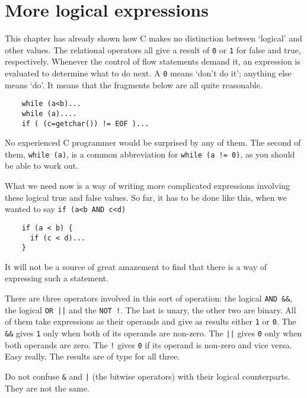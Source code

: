  
        \section{More logical expressions}
        

  

  This chapter has already shown how C makes no distinction between
   `logical' and other values. The relational operators all give a
   result of \texttt{0} or \texttt{1} for false and true,
   respectively. Whenever the control of flow statements demand it, an
   expression is evaluated to determine what to do next. A \texttt{0}
   means `don't do it'; anything else means `do'. It means that
   the fragments below are all quite reasonable.


  \begin{Verbatim}
    while (a<b)...
    while (a)....
    if ( (c=getchar()) != EOF )...
  \end{Verbatim}

  No experienced C programmer would be surprised by any of them. The second
   of them, \texttt{while (a)}, is a common abbreviation for
   \texttt{while (a != 0)}, as you should be able to work
   out.


  What we need now is a way of writing more complicated expressions
   involving these logical true and false values. So far, it has to be done
   like this, when we wanted to say
   \texttt{if (a<b AND c<d)}


  \begin{Verbatim}
    if (a < b) {
      if (c < d)...
    }
  \end{Verbatim}

  It will not be a source of great amazement to find that there is a way of
   expressing such a statement.


  There are three operators involved in this sort of operation: the logical
   \texttt{AND \&\&}, the logical \texttt{OR ||} and
   the \texttt{NOT !}. The last is unary, the other two are binary.
   All of them take expressions as their operands and give as results
   either \texttt{1} or \texttt{0}.
   The \texttt{\&\&} gives \texttt{1} only when both
   of its operands are non-zero. The \texttt{||}
   gives \texttt{0} only when both operands are zero.
   The \texttt{!} gives \texttt{0} if its operand is
   non-zero and vice versa. Easy really. The results are of type
   \kint{} for all three.


  Do not confuse \texttt{\&} and \texttt{|} (the bitwise
   operators) with their logical counterparts. They are not the same.


